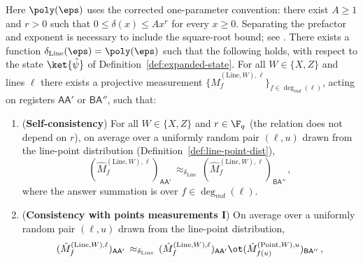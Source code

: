 \begin{lemma}
	\label{lem:qld-comm-line-cons}
	\leanok
	Here $\poly(\eps)$ uses the corrected one-parameter convention: there
	exist $A \geq 1$ and $r>0$ such that
	$0 \leq \delta(x) \leq A x^r$ for every $x \geq 0$. Separating the
	prefactor and exponent is necessary to include the square-root bound;
	see \cite{gap:qpbt_polynomial-error-square-root}.
	There exists a function $\delta_{\mathrm{Line}}(\eps) = \poly(\eps)$
	such that the following holds, with respect to the state
	$\ket{\hat{\psi}}$ of Definition~\ref{def:expanded-state}. For all
	$W \in \{X,Z\}$ and lines $\ell$ there exists a projective measurement
	$\{\hat{M}^{(\mathrm{Line},W),\ell}_f\}_{f \in \deg_{md}(\ell)}$,
	acting on registers $\mathsf{A}\mathsf{A}'$ or
	$\mathsf{B}\mathsf{A}''$, such that:
	\begin{enumerate}
		\item \label{enu:qld-comm-line-self-cons}
		(\textbf{Self-consistency}) For all $W \in \{X,Z\}$ and
		$r \in \F_q$ (the relation does not depend on $r$), on average over
		a uniformly random pair $(\ell,u)$ drawn from the line-point
		distribution (Definition~\ref{def:line-point-dist}),
		\[
			(\hat{M}^{(\mathrm{Line},W),\ell}_f)_{\mathsf{A}\mathsf{A}'}
			\,\approx_{\delta_{\mathrm{Line}}}\,
			(\hat{M}^{(\mathrm{Line},W),\ell}_f)_{\mathsf{B}\mathsf{A}''}\,,
		\]
		where the answer summation is over $f \in \deg_{md}(\ell)$.
		\item \label{eq:qld-comm-line-pt-cons}
		(\textbf{Consistency with points measurements I}) On average over
		a uniformly random pair $(\ell,u)$ drawn from the line-point
		distribution,
		\[
			(\hat{M}^{(\mathrm{Line},W),\ell}_f)_{\mathsf{A}\mathsf{A}'}
			\,\approx_{\delta_{\mathrm{Line}}}\,
			(\hat{M}^{(\mathrm{Line},W),\ell}_f)_{\mathsf{A}\mathsf{A}'}
			\ot (\hat{M}^{(\mathrm{Point},W),u}_{f(u)})_{\mathsf{B}\mathsf{A}''}\,,
\]
\end{enumerate}
\end{lemma}
